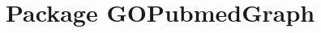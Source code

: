 \hypertarget{namespace_g_o_pubmed_graph}{
\section{Package GOPubmedGraph}
\label{namespace_g_o_pubmed_graph}
}
